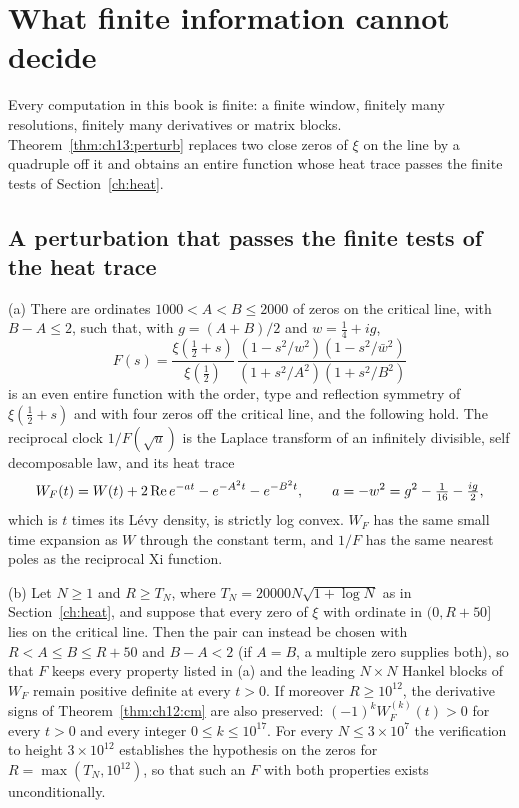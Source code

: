 \section{What finite information cannot decide}\label{ch:finite}

Every computation in this book is finite: a finite window, finitely many resolutions, finitely many derivatives or matrix blocks. Theorem~\ref{thm:ch13:perturb} replaces two close zeros of $\xi$ on the line by a quadruple off it \cite[Chapter 11]{P26} and obtains an entire function whose heat trace passes the finite tests of Section~\ref{ch:heat}.

\subsection{A perturbation that passes the finite tests of the heat trace}\label{sec:ch13:perturb}

\begin{theorem}[{\cite[Theorem D]{P17}}]\label{thm:ch13:perturb}
\textup{(a)} There are ordinates $1000<A<B\le2000$ of zeros on the critical line, with $B-A\le2$, such that, with $g=(A+B)/2$ and $w=\frac14+ig$,
\[
F(s)=\frac{\xi(\frac12+s)}{\xi(\frac12)}\,\frac{(1-s^2/w^2)(1-s^2/\bar w^2)}{(1+s^2/A^2)(1+s^2/B^2)}
\]
is an even entire function with the order, type and reflection symmetry of $\xi(\frac12+s)$ and with four zeros off the critical line, and the following hold. The reciprocal clock $1/F(\sqrt u)$ is the Laplace transform of an infinitely divisible, self decomposable law, and its heat trace
\[
W_F(t)=W(t)+2\operatorname{Re} e^{-at}-e^{-A^2t}-e^{-B^2t},\qquad a=-w^2=g^2-\tfrac1{16}-\tfrac{ig}2,
\]
which is $t$ times its L\'evy density, is strictly log convex. $W_F$ has the same small time expansion as $W$ through the constant term, and $1/F$ has the same nearest poles as the reciprocal Xi function.

\textup{(b)} Let $N\ge1$ and $R\ge T_N$, where $T_N=20000N\sqrt{1+\log N}$ as in Section~\ref{ch:heat}, and suppose that every zero of $\xi$ with ordinate in $(0,R+50]$ lies on the critical line. Then the pair can instead be chosen with $R<A\le B\le R+50$ and $B-A<2$ (if $A=B$, a multiple zero supplies both), so that $F$ keeps every property listed in (a) and the leading $N\times N$ Hankel blocks of $W_F$ remain positive definite at every $t>0$. If moreover $R\ge10^{12}$, the derivative signs of Theorem~\ref{thm:ch12:cm} are also preserved: $(-1)^kW_F^{(k)}(t)>0$ for every $t>0$ and every integer $0\le k\le10^{17}$. For every $N\le3\times10^7$ the verification to height $3\times10^{12}$ \cite{PT21} establishes the hypothesis on the zeros for $R=\max(T_N,10^{12})$, so that such an $F$ with both properties exists unconditionally.
\end{theorem}

